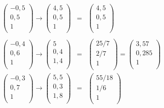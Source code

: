 \documentclass[11pt]{article}
\begin{document}
\begin{enumerate}
\begin{eqnarray*}
\begin{pmatrix}
-0,5 \\ 0,5 \\ 1 \\
\end{pmatrix}
\rightarrow
\begin{pmatrix}
4,5 \\ 0,5 \\ 1 \\
\end{pmatrix}
&=&
\begin{pmatrix}
4,5 \\ 0,5 \\ 1 \\
\end{pmatrix}\\\\
\begin{pmatrix}
-0,4 \\ 0,6 \\ 1 \\
\end{pmatrix}
\rightarrow
\begin{pmatrix}
5 \\ 0,4 \\ 1,4 \\
\end{pmatrix}
&=&
\begin{pmatrix}
25/7 \\ 2/7 \\ 1 \\
\end{pmatrix}
=
\begin{pmatrix}
3,57 \\ 0,285 \\ 1 \\
\end{pmatrix}
\\
\begin{pmatrix}
-0,3 \\ 0,7 \\ 1 \\
\end{pmatrix}
\rightarrow
\begin{pmatrix}
5,5 \\ 0,3 \\ 1,8 \\
\end{pmatrix}
&=&
\begin{pmatrix}
55/18 \\ 1/6 \\ 1 \\

\end{pmatrix}
\end{eqnarray*}
\end{enumerate}
\end{document}
